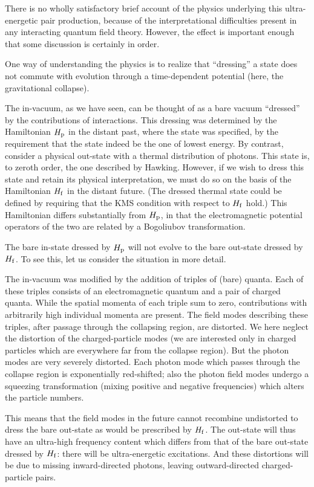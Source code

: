\documentclass[11pt]{article}
\begin{document}
There is no wholly satisfactory brief account of the physics
underlying this ultra-energetic pair production, because of the interpretational
difficulties present in any interacting quantum field theory.  However, the
effect is important enough that some discussion is certainly in order.

One way of understanding the physics is to realize that ``dressing'' a state
does not commute with evolution through a time-dependent potential (here, the
gravitational collapse).

The in-vacuum, as we have seen, can be thought of as a bare vacuum ``dressed''
by the contributions of interactions.  
This dressing was determined by the Hamiltonian $H_{\rm p}$
in the distant past, where the
state was specified, by the requirement that the state indeed be 
the one of lowest energy. 
By contrast, consider a physical out-state with a thermal distribution of
photons.  This state is, to zeroth order, the one described by Hawking. 
However, if we wish to dress this state and retain its physical interpretation,
we must do so on the basis of the Hamiltonian $H_{\rm f}$ in the distant future.
(The dressed thermal state could be defined by requiring that the KMS
condition with respect to $H_{\rm f}$ hold.)
This Hamiltonian differs substantially from $H_{\rm p}$, in that the
electromagnetic potential operators of the two are related by a Bogoliubov
transformation.

The bare in-state dressed by $H_{\rm p}$ will not evolve to the bare out-state
dressed by $H_{\rm f}$. To see this, let us consider the situation in more
detail.

The in-vacuum was modified by the addition of 
triples of (bare) quanta.  Each of these triples
consists of an electromagnetic quantum and a pair of charged quanta.  While the
spatial momenta of each triple sum to zero, contributions with arbitrarily high
individual momenta are present.
The field modes describing these triples, after passage through the collapsing
region, are distorted.  We here neglect the distortion of the charged-particle
modes (we are interested only in charged particles which are everywhere far
from the collapse region).  But the photon modes are very severely
distorted.  Each photon mode which passes through the collapse
region is exponentially red-shifted; also the photon field modes undergo a
squeezing transformation (mixing positive and negative frequencies) which alters
the particle numbers.  

This means that the field modes in the future cannot recombine undistorted to
dress the bare out-state as would be prescribed by $H_{\rm f}$.  The out-state
will thus have an ultra-high frequency content which differs from that 
of the bare out-state
dressed by $H_{\rm f}$:  there will be ultra-energetic excitations.
And these distortions will be due to missing inward-directed photons,
leaving outward-directed charged-particle pairs.
\end{document}
